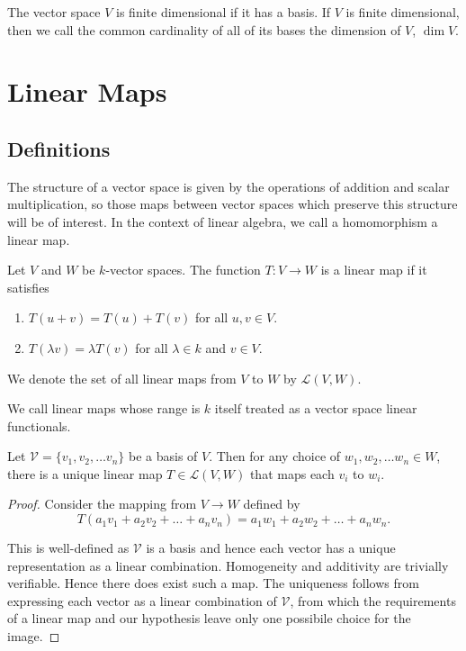 \documentclass[]{article}
\begin{document}
\begin{defi} 
		The vector space $V$ is finite dimensional if it has a basis.
		If $V$ is finite dimensional, then we call the common cardinality of all of its bases the dimension of $V$, $\dim V$.
\end{defi}

\section{Linear Maps}

\subsection{Definitions}

The structure of a vector space is given by the operations of addition and scalar multiplication, so those maps between vector spaces which preserve this structure will be of interest. In the context of linear algebra, we call a homomorphism a linear map.

\begin{defi} 
		Let $V$ and $W$ be $k$-vector spaces. The function $T: V \to W$ is a linear map if it satisfies
		\begin{enumerate}
				\item $T(u + v) = T(u) + T(v)$ for all $u, v \in V$.
				\item $T(\lambda v) = \lambda T(v)$ for all $\lambda \in k$ and $v \in V$.
		\end{enumerate}

		We denote the set of all linear maps from $V$ to $W$ by $\mathcal{L}(V,W)$.

		We call linear maps whose range is $k$ itself treated as a vector space linear functionals.
\end{defi}

\begin{thm}
		Let $\mathcal{V} = \{v_1, v_2, \ldots v_n\}$ be a basis of $V$. Then for any choice of $w_1, w_2, \ldots w_n \in W$, there is a unique linear map $T \in \mathcal{L}(V,W)$ that maps each $v_i$ to $w_i$.
\end{thm}

\begin{proof}
		Consider the mapping from $V \to W$ defined by
		\[
		T(a_1 v_1 + a_2 v_2 + \ldots + a_n v_n) = a_1 w_1 + a_2 w_2 + \ldots + a_n w_n
		.\] 

		This is well-defined as $\mathcal{V}$ is a basis and hence each vector has a unique representation as a linear combination. Homogeneity and additivity are trivially verifiable. Hence there does exist such a map. The uniqueness follows from expressing each vector as a linear combination of $\mathcal{V}$, from which the requirements of a linear map and our hypothesis leave only one possibile choice for the image.
\end{proof}
\end{document}
